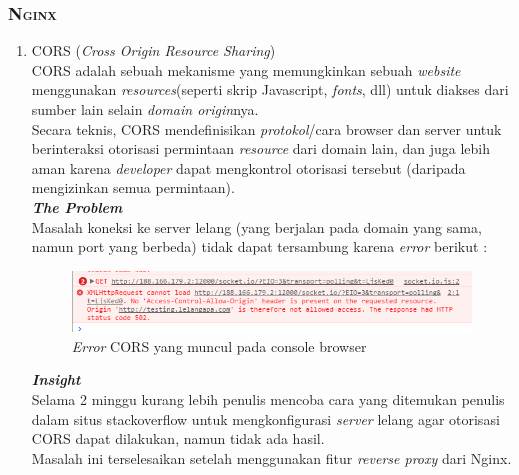\subsubsection{\textsc{Nginx}}

\begin{enumerate}
	\item CORS (\textit{Cross Origin Resource Sharing})
	\\
	\indentenum CORS adalah sebuah mekanisme yang memungkinkan  sebuah \textit{website} menggunakan \textit{resources}(seperti skrip Javascript, \textit{fonts}, dll) untuk diakses dari sumber lain selain \textit{domain origin}nya.\\ 
	\indentenum Secara teknis, CORS mendefinisikan \textit{protokol}/cara browser dan server untuk berinteraksi otorisasi permintaan \textit{resource} dari domain lain, dan juga lebih aman karena \textit{developer} dapat mengkontrol otorisasi tersebut (daripada mengizinkan semua permintaan).\\
	
	\textbf{\textit{The Problem}} \\
	\indentenum  Masalah koneksi ke server lelang (yang berjalan pada domain yang sama, namun port yang berbeda) tidak dapat tersambung karena \textit{error} berikut :


	\begin{figure}[H]
		\centering
		\includegraphics[width=\textwidth]{images/bab4/pl/madafaka_cors.png}
		\caption{\textit{Error} CORS yang muncul pada console browser}
		\label{cors}
	\end{figure}
	
	
	\textbf{\textit{Insight}} \\
	\indentenum Selama 2 minggu kurang lebih penulis mencoba cara yang ditemukan penulis dalam situs stackoverflow untuk mengkonfigurasi \textit{server} lelang agar otorisasi CORS dapat dilakukan, namun tidak ada hasil.\\
	\indent Masalah ini terselesaikan setelah menggunakan fitur \textit{reverse proxy} dari Nginx.\\
	

\end{enumerate}
